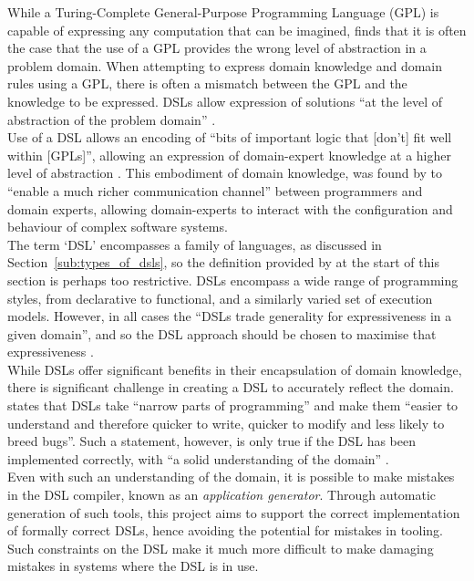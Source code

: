 \documentclass[a4paper,11pt]{report}
\begin{document}
While a Turing-Complete General-Purpose Programming Language (GPL) is capable of expressing any computation that can be imagined, \citet{fowler2010domain} finds that it is often the case that the use of a GPL provides the wrong level of abstraction in a problem domain.
When attempting to express domain knowledge and domain rules using a GPL, there is often a mismatch between the GPL and the knowledge to be expressed. 
DSLs allow expression of solutions ``at the level of abstraction of the problem domain'' \citep{van2000domain}.\\

Use of a DSL allows an encoding of ``bits of important logic that [don't] fit well within [GPLs]'', allowing an expression of domain-expert knowledge at a higher level of abstraction \citep{fowler2010domain,van2000domain}. 
This embodiment of domain knowledge, was found by \citet{fowler2010domain} to ``enable a much richer communication channel'' between programmers and domain experts, allowing domain-experts to interact with the configuration and behaviour of complex software systems. \\

The term `DSL' encompasses a family of languages, as discussed in Section~\ref{sub:types_of_dsls}, so the definition provided by \citet{van2000domain} at the start of this section is perhaps too restrictive. 
DSLs encompass a wide range of programming styles, from declarative to functional, and a similarly varied set of execution models. 
However, in all cases the ``DSLs trade generality for expressiveness in a given domain'', and so the DSL approach should be chosen to maximise that expressiveness \citep{Mernik:2005:DDL:1118890.1118892}. \\

While DSLs offer significant benefits in their encapsulation of domain knowledge, there is significant challenge in creating a DSL to accurately reflect the domain. 
\citet{fowler2010domain} states that DSLs take ``narrow parts of programming'' and make them ``easier to understand and therefore quicker to write, quicker to modify and less likely to breed bugs''. 
Such a statement, however, is only true if the DSL has been implemented correctly, with ``a solid understanding of the domain'' \citep[pg. 1]{bosch1997domain}.\\

Even with such an understanding of the domain, it is possible to make mistakes in the DSL compiler, known as an \textit{application generator}.
Through automatic generation of such tools, this project aims to support the correct implementation of formally correct DSLs, hence avoiding the potential for mistakes in tooling. 
Such constraints on the DSL make it much more difficult to make damaging mistakes in systems where the DSL is in use. 
\end{document}
